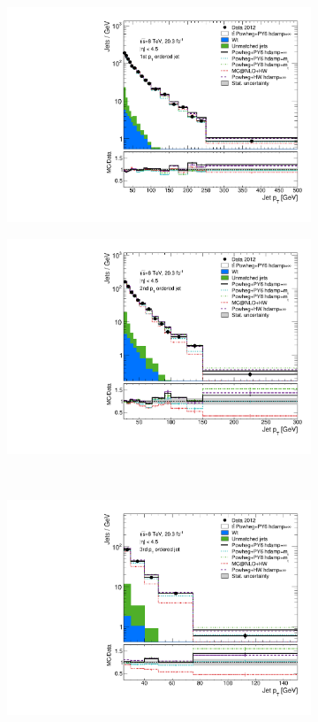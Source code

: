 \begin{figure}
\centering
\begin{subfigure}[]{0.45\textwidth}
\includegraphics[width=\textwidth]{fig/MCComp/NLO/RecoPtJet0.pdf}
\end{subfigure}
\begin{subfigure}[]{0.45\textwidth}
\includegraphics[width=\textwidth]{fig/MCComp/NLO/RecoPtJet1.pdf}
\end{subfigure}
\\
\begin{subfigure}[]{0.45\textwidth}
\includegraphics[width=\textwidth]{fig/MCComp/NLO/RecoPtJet2.pdf}

\end{subfigure}
\end{figure}
